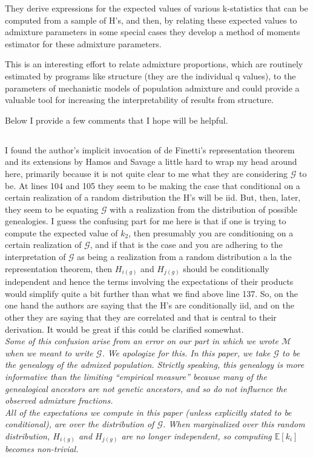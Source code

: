 \documentclass[11pt]{amsart}
\begin{document}
They derive expressions for the expected values of various k-statistics that can be computed from a
sample of H's, and then, by relating these expected values to admixture parameters in some special cases
they develop a method of moments estimator for these admixture parameters.

This is an interesting effort to relate admixture proportions, which are routinely estimated by programs
like structure (they are the individual q values), to the parameters of mechanistic models of population
admixture and could provide a valuable tool for increasing the interpretability of results from structure.

Below I provide a few comments that I hope will be helpful.

\subsection{} I found the author's implicit invocation of de Finetti's representation theorem and its extensions by Hamos and Savage a little hard to wrap my head around here, primarily because it is not quite clear to me what they are considering $\mathcal{G}$ to be. 
At lines 104 and 105 they seem to be making the case that conditional on a certain realization of a random distribution the H's will be iid. 
But, then, later, they seem to be equating $\mathcal{G}$ with a realization from the distribution of possible genealogies. 
I guess the confusing part for me here is that if one is trying to compute the expected value of $k_2$, then presumably you are conditioning on a certain realization of $\mathcal{G}$, 
and if that is the case and you are adhering to
the interpretation of $\mathcal{G}$ as being a realization from a random distribution a la the representation theorem, 
then $H_{i(g)}$ and $H_{j(g)}$ should be conditionally independent and hence the terms involving the
expectations of their products would simplify quite a bit further than what we find above line 137. 
So, on the one hand the authors are saying that the H's are conditionally iid, and on the other they are saying that they are correlated and that is central to their derivation. 
It would be great if this could be clarified somewhat.\\
\textit{
	\indent
	Some of this confusion arise from an error on our part in which we wrote $\mathcal{M}$ when we meant to write $\mathcal{G}$.
	We apologize for this.
	In this paper, we take $\mathcal{G}$ to be the genealogy of the admixed population.
	Strictly speaking, this genealogy is more informative than the limiting ``empirical measure'' because many of the genealogical ancestors are not genetic ancestors, and so do not influence the observed admixture fractions. \\
	\indent 
	All of the expectations we compute in this paper (unless explicitly stated to be conditional), are over the distribution of $\mathcal{G}$. When marginalized over this random distribution, $H_{i(g)}$ and $H_{j(g)}$ are no longer independent, so computing $\mathbb{E}[k_i]$ becomes non-trivial.
}
\end{document}
